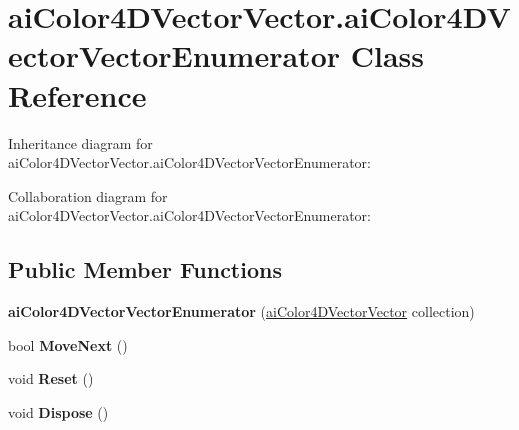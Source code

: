\hypertarget{classai_color4_d_vector_vector_1_1ai_color4_d_vector_vector_enumerator}{\section{ai\+Color4\+D\+Vector\+Vector.\+ai\+Color4\+D\+Vector\+Vector\+Enumerator Class Reference}
\label{classai_color4_d_vector_vector_1_1ai_color4_d_vector_vector_enumerator}
}


Inheritance diagram for ai\+Color4\+D\+Vector\+Vector.\+ai\+Color4\+D\+Vector\+Vector\+Enumerator\+:


Collaboration diagram for ai\+Color4\+D\+Vector\+Vector.\+ai\+Color4\+D\+Vector\+Vector\+Enumerator\+:
\subsection*{Public Member Functions}
\begin{DoxyCompactItemize}
\item 
\hypertarget{classai_color4_d_vector_vector_1_1ai_color4_d_vector_vector_enumerator_acab018faa2beb0e7c0c6a6ccd30d2091}{{\bfseries ai\+Color4\+D\+Vector\+Vector\+Enumerator} (\hyperlink{classai_color4_d_vector_vector}{ai\+Color4\+D\+Vector\+Vector} collection)}\label{classai_color4_d_vector_vector_1_1ai_color4_d_vector_vector_enumerator_acab018faa2beb0e7c0c6a6ccd30d2091}

\item 
\hypertarget{classai_color4_d_vector_vector_1_1ai_color4_d_vector_vector_enumerator_aaca3197f12ae4318140e470201a12073}{bool {\bfseries Move\+Next} ()}\label{classai_color4_d_vector_vector_1_1ai_color4_d_vector_vector_enumerator_aaca3197f12ae4318140e470201a12073}

\item 
\hypertarget{classai_color4_d_vector_vector_1_1ai_color4_d_vector_vector_enumerator_a9e521c5dd62143687faf3678ddefb65d}{void {\bfseries Reset} ()}\label{classai_color4_d_vector_vector_1_1ai_color4_d_vector_vector_enumerator_a9e521c5dd62143687faf3678ddefb65d}

\item 
\hypertarget{classai_color4_d_vector_vector_1_1ai_color4_d_vector_vector_enumerator_a4a3e492ae1c876cbf5b0cf74cf7b3803}{void {\bfseries Dispose} ()}\label{classai_color4_d_vector_vector_1_1ai_color4_d_vector_vector_enumerator_a4a3e492ae1c876cbf5b0cf74cf7b3803}

\end{DoxyCompactItemize}
